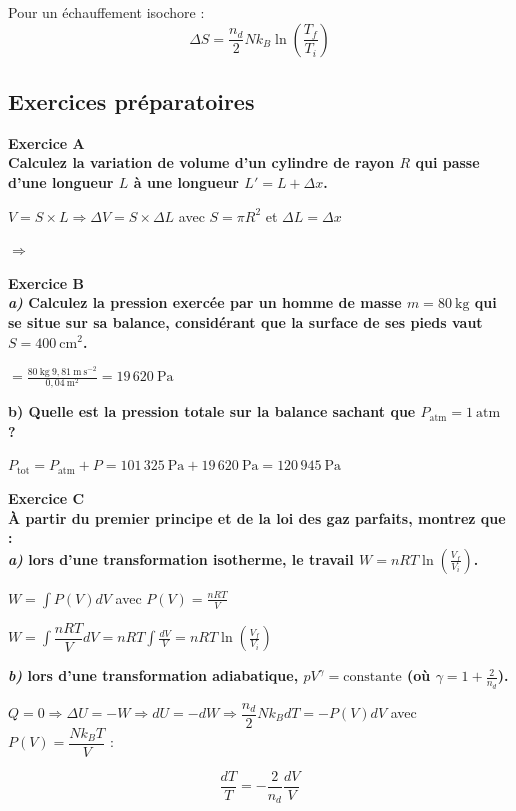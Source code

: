 \documentclass	[11pt, a4paper, openany]{book}
\newcommand{\exerc}[2]{\textbf{\Large Exercice #1\normalsize \\#2}}
\begin{document}
	Pour un échauffement isochore : $$ \Delta S = \frac{n_d}{2}Nk_B\ln (\frac{T_f}{T_i})$$
	
	
	
	
	
	\subsection{Exercices préparatoires}

\exerc{A}{Calculez la variation de volume d’un cylindre de rayon $R$ qui passe d’une longueur $L$ à
une longueur $L' = L + \Delta x$.}

	$V = S \times L \Rightarrow \Delta V = S \times \Delta L$ avec $S = \pi R^2$ et $\Delta L = \Delta x$
	
	$\Rightarrow$ 

\vspace{0,5cm}

\exerc{B}{\textit{a)} Calculez la pression exercée par un homme de masse $m = 80\ \text{kg}$ qui se situe sur sa
balance, considérant que la surface de ses pieds vaut $S = 400\ \text{cm}^2$.}
	
	 $= \frac{80\ \text{kg}\ 9,81\ \text{m}\ \text{s}^{-2}}{0,04\ \text{m}^2} = 19\,620\ \text{Pa}$
	
	\textbf{b) Quelle est la pression totale sur la balance sachant que $P_{\text{atm}} = 1\ \text{atm}$ ?}
	
	$P_{\text{tot}} = P_{\text{atm}} + P = 101\,325\ \text{Pa} + 19\,620\ \text{Pa} = 120\,945\ \text{Pa}$

\vspace{0,5cm}

\exerc{C}{À partir du premier principe et de la loi des gaz parfaits, montrez que :\\ \textit{a)} lors d’une transformation isotherme, le travail $W = nRT \ln(\frac{V_f}{V_i})$.}
	
	$W = \int P(V)dV$ avec $P(V) = \frac{nRT}{V}$
	
	$W = \int \dfrac{nRT}{V} dV = nRT \int \frac{dV}{V} = nRT \ln(\frac{V_f}{V_i})$
	
	\textbf{\textit{b)} lors d’une transformation adiabatique, $pV^{\gamma} = \text{constante}$ (où $\gamma = 1 + \frac{2}{n_d}$).}
	
	$Q = 0 \Rightarrow \Delta U = -W \Rightarrow dU = -dW \Rightarrow \dfrac{n_d}{2}Nk_BdT = -P(V)dV $ avec $P(V) = \dfrac{Nk_BT}{V}$ :
	
	$$\dfrac{dT}{T} = -\dfrac{2}{n_d}\dfrac{dV}{V}$$
	
\end{document}
